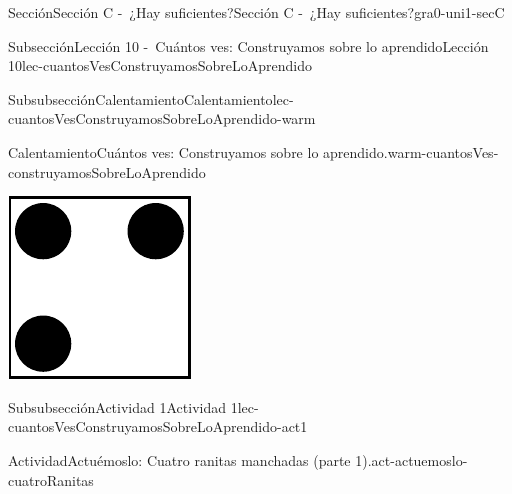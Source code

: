 \documentclass[twoside,10pt,]{article}
\begin{document}
\begin{sectionptx}{Sección}{Sección C -~¿Hay suficientes?}{}{Sección C -~¿Hay suficientes?}{}{}{gra0-uni1-secC}
\begin{subsectionptx}{Subsección}{Lección 10 -~Cuántos ves: Construyamos sobre lo aprendido}{}{Lección 10}{}{}{lec-cuantosVesConstruyamosSobreLoAprendido}
\begin{subsubsectionptx}{Subsubsección}{Calentamiento}{}{Calentamiento}{}{}{lec-cuantosVesConstruyamosSobreLoAprendido-warm}
\begin{exploration}{Calentamiento}{Cuántos ves: Construyamos sobre lo aprendido.}{warm-cuantosVes-construyamosSobreLoAprendido}
\begin{sidebyside}{2}{0}{0}{0}
\begin{sbspanel}{0.5}
\includegraphics[width=\linewidth]{external/svg-source/tikz-file-147346.pdf}
\end{sbspanel}%
\end{sidebyside}%
\end{exploration}%
\end{subsubsectionptx}
%
%
\typeout{************************************************}
\typeout{************************************************}
%
\begin{subsubsectionptx}{Subsubsección}{Actividad 1}{}{Actividad 1}{}{}{lec-cuantosVesConstruyamosSobreLoAprendido-act1}
\begin{activity}{Actividad}{Actuémoslo: Cuatro ranitas manchadas (parte 1).}{act-actuemoslo-cuatroRanitas}%
\begin{image}{0.275}{0.45}{0.275}{}%

\end{image}
\end{activity}
\end{subsubsectionptx}
\end{subsectionptx}
\end{sectionptx}
\end{document}
